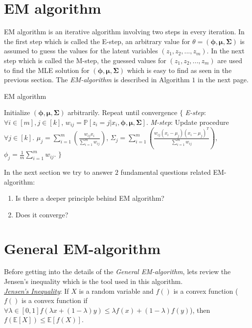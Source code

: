 \documentclass[a4paper,english,12pt]{article}
\begin{document}
\section{EM algorithm}
EM algorithm is an iterative algorithm involving two steps in every iteration. In the first step which is called the E-step, an arbitrary value for $\theta=\left(\pmb{\phi},\boldsymbol{\mu},\boldsymbol{\Sigma}\right)$ is assumed to guess the values for the latent variables $(z_1, z_2, ... , z_m)$. In the next step which is called the M-step, the guessed values for $(z_1, z_2, ... , z_m)$ are used to find the MLE solution for $\left(\pmb{\phi},\boldsymbol{\mu},\boldsymbol{\Sigma}\right)$ which is easy to find as seen in the previous section. The \textit{EM-algorithm} is described in Algorithm $1$ in the next page.
\begin{algorithm}
\caption{EM algorithm}\label{euclid}
\begin{algorithmic}[1]
\Procedure{}{}
\State Initialize  $\left(\pmb{\phi},\boldsymbol{\mu},\boldsymbol{\Sigma}\right)$ arbitrarily.
\State Repeat until convergence $\lbrace$
\BState \emph{E-step}:
\State $\forall i \in [m], j \in [k]$,
\State $w_{ij} = \mathbb{P}[z_i = j|x_i, \pmb{\phi},\boldsymbol{\mu},\boldsymbol{\Sigma}]$.
\BState \emph{M-step}: Update procedure
\State $\forall j \in [k]$.
\State $\mu_j = \sum\limits_{i=1}^{m} \left(\frac{w_{ij}x_i}{\sum\limits_{i=1}^m w_{ij}}\right)$, $\Sigma_j = \sum\limits_{i=1}^{m} \left(\frac{w_{ij}(x_i-\mu_j)(x_i-\mu_j)^T}{\sum\limits_{i=1}^m w_{ij}}\right)$,
\State $ \phi_j=\frac{1}{m}\sum\limits_{i=1}^m w_{ij}$.
\State $\rbrace$
\EndProcedure
\end{algorithmic}
\end{algorithm}
\newpage
In the next section we try to answer $2$ fundamental questions related EM-algorithm:
\begin{enumerate}
\item Is there a deeper principle behind EM algorithm?
\item Does it converge?
\end{enumerate}
\section{General EM-algorithm}
Before getting into the details of the \textit{General EM-algorithm}, lets review the Jensen's inequality which is the tool used in this algorithm.\\

\textit{\underline{Jensen's Inequality}}: If $X$ is a random variable and $f()$ is a convex function ($f()$ is a convex function if $\forall \lambda \in [0,1] f(\lambda x + (1-\lambda)y)\leq\lambda f(x)+(1-\lambda)f(y)$), then $f(\mathbb{E}[X])\leq \mathbb{E}[f(X)]$.\\ 
\end{document}
